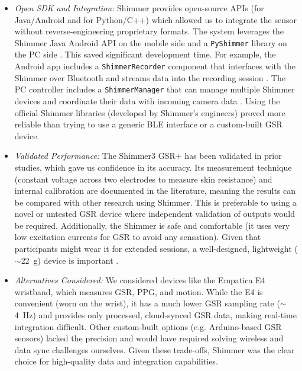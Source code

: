 \documentclass{report}
\begin{document}
\begin{itemize}
        \item \textit{Open SDK and Integration:} Shimmer provides open-source APIs (for Java/Android and for Python/C++) which allowed us to integrate the sensor without reverse-engineering proprietary formats. The system leverages the Shimmer Java Android API on the mobile side and a \texttt{PyShimmer} library on the PC side \cite{shimmerapi15}. This saved significant development time. For example, the Android app includes a \texttt{ShimmerRecorder} component that interfaces with the Shimmer over Bluetooth and streams data into the recording session \cite{shimmerapi15}. The PC controller includes a \texttt{ShimmerManager} that can manage multiple Shimmer devices and coordinate their data with incoming camera data \cite{shimmerapi15}. Using the official Shimmer libraries (developed by Shimmer's engineers) proved more reliable than trying to use a generic BLE interface or a custom-built GSR device.

        \item \textit{Validated Performance:} The Shimmer3 GSR+ has been validated in prior studies, which gave us confidence in its accuracy. Its measurement technique (constant voltage across two electrodes to measure skin resistance) and internal calibration are documented in the literature, meaning the results can be compared with other research using Shimmer. This is preferable to using a novel or untested GSR device where independent validation of outputs would be required. Additionally, the Shimmer is safe and comfortable (it uses very low excitation currents for GSR to avoid any sensation). Given that participants might wear it for extended sessions, a well-designed, lightweight ($\sim$22~g) device is important \cite{shimmerdoc8}.

        \item \textit{Alternatives Considered:} We considered devices like the Empatica E4 wristband, which measures GSR, PPG, and motion. While the E4 is convenient (worn on the wrist), it has a much lower GSR sampling rate ($\sim$4~Hz) and provides only processed, cloud-synced GSR data, making real-time integration difficult. Other custom-built options (e.g. Arduino-based GSR sensors) lacked the precision and would have required solving wireless and data sync challenges ourselves. Given these trade-offs, Shimmer was the clear choice for high-quality data and integration capabilities.
    \end{itemize}
\end{document}
